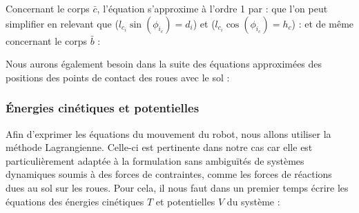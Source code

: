 					Concernant le corps $\bar{c}$, l'équation  s'approxime à l'ordre 1 par :
					que l'on peut simplifier en relevant  que ($l_{c_i}\sin(\phi_{i_c}) = d_i$) et ($l_{c_i}\cos(\phi_{i_c}) = h_c$) :
					et de même concernant le corps $\bar{b}$ :
					
					Nous aurons également besoin dans la suite des équations approximées des positions des points de contact des roues avec le sol :

			
			\subsubsection{Énergies cinétiques et potentielles}
			
				\label{section.contrainte_basculement}
				
					Afin d'exprimer les équations du mouvement du robot, nous allons utiliser la méthode Lagrangienne.
					Celle-ci est pertinente dans notre cas car elle est particulièrement adaptée à la formulation sans ambiguïtés de systèmes dynamiques soumis à des forces de contraintes, comme les forces de réactions dues au sol sur les roues. 
					Pour cela, il nous faut dans un premier temps écrire les équations des énergies cinétiques $T$ et potentielles $V$ du système :
					
